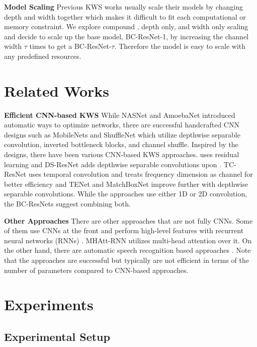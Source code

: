 \documentclass[a4paper]{article}
\begin{document}
\noindent \textbf{Model Scaling} Previous KWS works usually scale their models by changing depth and width together \cite{tcresnet, matchbox, tenet} which makes it difficult to fit each computational or memory constraint. We explore compound \cite{efficientnet}, depth only, and width only scaling and decide to scale up the base model, BC-ResNet-1, by increasing the channel width $\tau$ times to get a BC-ResNet-$\tau$. Therefore the model is easy to scale with any predefined resources.


\section{Related Works}

\noindent \textbf{Efficient CNN-based KWS} While NASNet \cite{nasnet} and AmoebaNet \cite{amoeba} introduced automatic ways to optimize networks, there are successful handcrafted CNN designs such as MobileNets \cite{mobilenet1, mobilenet2} and ShuffleNet \cite{shufflenet} which utilize depthwise separable convolution, inverted bottleneck blocks, and channel shuffle. Inspired by the designs, there have been various CNN-based KWS approaches. \cite{res15} uses residual learning and DS-ResNet \cite{ds-resnet} adds depthwise separable convolutions upon \cite{res15}. TC-ResNet \cite{tcresnet} uses temporal convolution and treats frequency dimension as channel for better efficiency and TENet \cite{tenet} and MatchBoxNet \cite{matchbox} improve further with depthwise separable convolutions. While the approaches use either 1D or 2D convolution, the BC-ResNets suggest combining both.

\noindent \textbf{Other Approaches} There are other approaches that are not fully CNNs. Some of them use CNNs at the front and perform high-level features with recurrent neural networks (RNNs) \cite{att-rnn, orthogonalattn}. MHAtt-RNN \cite{mhatt-rnn} utilizes multi-head attention over it. On the other hand, there are automatic speech recognition based approaches \cite{LSTM-CTC,asrbase1}. Note that the approaches are successful but typically are not efficient in terms of the number of parameters compared to CNN-based approaches.


\section{Experiments}

\subsection{Experimental Setup}
\end{document}
